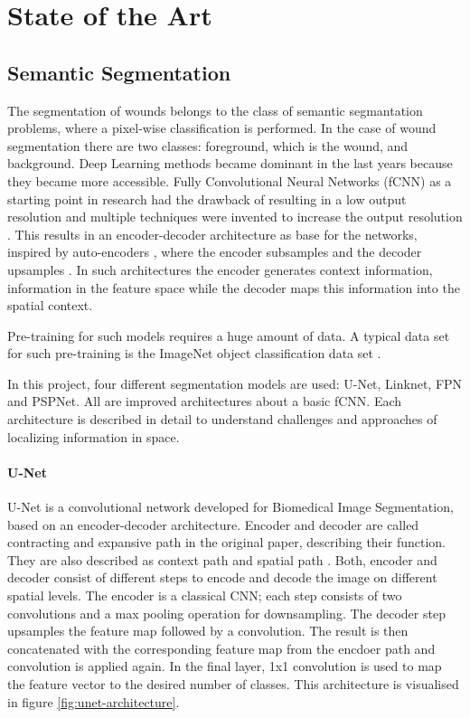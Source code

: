\section{State of the Art}

\subsection{Semantic Segmentation}\label{sec:semantic-segmentation}

The segmentation of wounds belongs to the class of semantic segmantation problems, where a pixel-wise classification is performed. In the case of wound segmentation there are two classes: foreground, which is the wound, and background. Deep Learning methods became dominant in the last years because they became more accessible. Fully Convolutional Neural Networks (fCNN) as a starting point in research had the drawback of resulting in a low output resolution and multiple techniques were invented to increase the output resolution \cite{Litjens2017}. This results in an encoder-decoder architecture as base for the networks, inspired by auto-encoders \cite{linknet}, where the encoder subsamples and the decoder upsamples \cite{Norelyaqine2023}. In such architectures the encoder generates context information, information in the feature space while the decoder maps this information into the spatial context.

Pre-training for such models requires a huge amount of data. A typical data set for such pre-training is the ImageNet object classification data set \cite{SegNet}.

In this project, four different segmentation models are used: U-Net, Linknet, FPN and PSPNet. All are improved architectures about a basic fCNN. Each architecture is described in detail to understand challenges and approaches of localizing information in space.

\paragraph{U-Net}

U-Net is a convolutional network developed for Biomedical Image Segmentation, based on an encoder-decoder architecture. Encoder and decoder are called contracting and expansive path in the original paper, describing their function. They are also described as context path and spatial path \cite{MO2022626}. Both, encoder and decoder consist of different steps to encode and decode the image on different spatial levels. The encoder is a classical CNN; each step consists of two convolutions and a max pooling operation for downsampling. The decoder step upsamples the feature map followed by a convolution. The result is then concatenated with the corresponding feature map from the encdoer path and convolution is applied again. In the final layer, 1x1 convolution is used to map the feature vector to the desired number of classes. This architecture is visualised in figure \ref{fig:unet-architecture}. \cite{unet}

